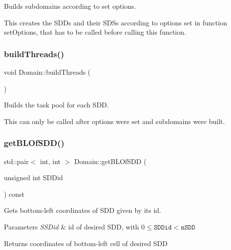 Builds subdomains according to set options. 

This creates the S\+D\+Ds and their S\+D\+Ss according to options set in function set\+Options, that has to be called before calling this function. \mbox{\label{classDomain_aa2e6cebf44a57323f3c6344d131126c1}} 
\subsubsection{\texorpdfstring{build\+Threads()}{buildThreads()}}
{\footnotesize\ttfamily void Domain\+::build\+Threads (\begin{DoxyParamCaption}{ }\end{DoxyParamCaption})}



Builds the task pool for each S\+DD. 

This can only be called after options were set and subdomains were built. \mbox{\label{classDomain_a29e2005bed3aa17f036b8d2b36084153}} 
\subsubsection{\texorpdfstring{get\+B\+L\+Of\+S\+D\+D()}{getBLOfSDD()}}
{\footnotesize\ttfamily std\+::pair$<$ int, int $>$ Domain\+::get\+B\+L\+Of\+S\+DD (\begin{DoxyParamCaption}\item[{unsigned int}]{S\+D\+Did }\end{DoxyParamCaption}) const}



Gets bottom-\/left coordinates of S\+DD given by its id. 


\begin{DoxyParams}{Parameters}
{\em S\+S\+Did} & id of desired S\+DD, with $0 \leq \texttt{SDDid} < \texttt{nSDD}$\\
\hline
\end{DoxyParams}
\begin{DoxyReturn}{Returns}
coordinates of bottom-\/left cell of desired S\+DD 
\end{DoxyReturn}
\mbox{\label{classDomain_a1f219d1f46645da98f538dada37432f9}} 
